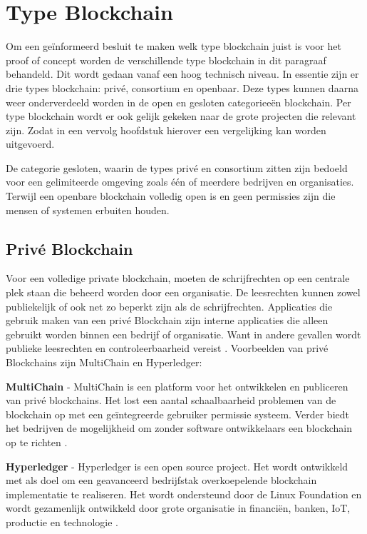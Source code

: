 \section{Type Blockchain}
Om een geïnformeerd besluit te maken welk type blockchain juist is voor het proof of concept worden de verschillende type blockchain in dit paragraaf behandeld. Dit wordt gedaan vanaf een hoog technisch niveau. In essentie zijn er drie types blockchain: privé, consortium en openbaar. Deze types kunnen daarna weer onderverdeeld worden in de open en gesloten categorieeën blockchain. Per type blockchain wordt er ook gelijk gekeken naar de grote projecten die relevant zijn. Zodat in een vervolg hoofdstuk hierover een vergelijking kan worden uitgevoerd.\par
					
De categorie gesloten, waarin de types privé en consortium zitten zijn bedoeld voor een gelimiteerde omgeving zoals één of meerdere bedrijven en organisaties. Terwijl een openbare blockchain volledig open is en geen permissies zijn die mensen of systemen erbuiten houden.

\subsection{Privé Blockchain}
Voor een volledige private blockchain, moeten de schrijfrechten op een centrale plek staan die beheerd worden door een organisatie. De leesrechten kunnen zowel publiekelijk of ook net zo beperkt zijn als de schrijfrechten. Applicaties die gebruik maken van een privé Blockchain zijn interne applicaties die alleen gebruikt worden binnen een bedrijf of organisatie. Want in andere gevallen wordt publieke leesrechten en controleerbaarheid vereist \cite{privateBlockChains}. Voorbeelden van privé Blockchains zijn MultiChain en Hyperledger:\par
\textbf{MultiChain} - MultiChain is een platform voor het ontwikkelen en publiceren van privé blockchains. Het lost een aantal schaalbaarheid problemen \cite{oreillyScalability} van de blockchain op met een geïntegreerde gebruiker permissie systeem. Verder biedt het bedrijven de mogelijkheid om zonder software ontwikkelaars een blockchain op te richten \cite{mutlichain}.

\textbf{Hyperledger} - Hyperledger is een open source project. Het wordt ontwikkeld met als doel om een geavanceerd bedrijfstak overkoepelende blockchain implementatie te realiseren. Het wordt ondersteund door de Linux Foundation \cite{linuxFoundation} en wordt gezamenlijk ontwikkeld door grote organisatie in financiën, banken, IoT, productie en technologie \cite{hyperledger}.

